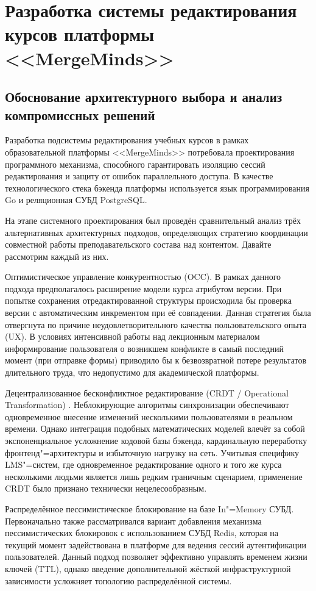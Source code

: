 \documentclass[coursework]{SCWorks}
\begin{document}
\section{Разработка системы редактирования курсов платформы <<MergeMinds>>}

\subsection{Обоснование архитектурного выбора и анализ компромиссных решений}

Разработка подсистемы редактирования учебных курсов в рамках образовательной платформы <<MergeMinds>> потребовала проектирования программного механизма, способного гарантировать изоляцию сессий редактирования и защиту от ошибок параллельного доступа. В качестве технологического стека бэкенда платформы используется язык программирования Go и реляционная СУБД PostgreSQL.

На этапе системного проектирования был проведён сравнительный анализ трёх альтернативных архитектурных подходов, определяющих стратегию координации совместной работы преподавательского состава над контентом. Давайте рассмотрим каждый из них.

Оптимистическое управление конкурентностью (OCC). В рамках данного подхода предполагалось расширение модели курса атрибутом версии. При попытке сохранения отредактированной структуры происходила бы проверка версии с автоматическим инкрементом при её совпадении. Данная стратегия была отвергнута по причине неудовлетворительного качества пользовательского опыта (UX). В условиях интенсивной работы над лекционным материалом информирование пользователя о возникшем конфликте в самый последний момент (при отправке формы) приводило бы к безвозвратной потере результатов длительного труда, что недопустимо для академической платформы.

Децентрализованное бесконфликтное редактирование (CRDT / Operational Transformation) \cite{crdt}. Неблокирующие алгоритмы синхронизации обеспечивают одновременное внесение изменений несколькими пользователями в реальном времени. Однако интеграция подобных математических моделей влечёт за собой экспоненциальное усложнение кодовой базы бэкенда, кардинальную переработку фронтенд"=архитектуры и избыточную нагрузку на сеть. Учитывая специфику LMS"=систем, где одновременное редактирование одного и того же курса несколькими людьми является лишь редким граничным сценарием, применение CRDT было признано технически нецелесообразным.

Распределённое пессимистическое блокирование на базе In"=Memory СУБД. Первоначально также рассматривался вариант добавления механизма пессимистических блокировок с использованием СУБД Redis, которая на текущий момент задействована в платформе для ведения сессий аутентификации пользователей. Данный подход позволяет эффективно управлять временем жизни ключей (TTL), однако введение дополнительной жёсткой инфраструктурной зависимости усложняет топологию распределённой системы.
\end{document}

